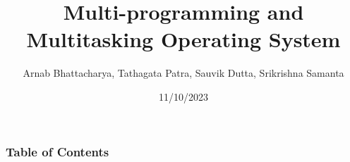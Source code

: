 \documentclass{beamer}
\title[]{Multi-programming and Multitasking Operating System} %
\author[]{Arnab Bhattacharya, Tathagata Patra, Sauvik Dutta, Srikrishna Samanta} %
\institute[] %
{
Department of Computer Science \\ %
\medskip
}
\date{11/10/2023} %
\begin{document}
\begin{frame}
\titlepage %
\end{frame}

\begin{frame}
\frametitle{Table of Contents} %
\tableofcontents %
\end{frame}



\end{document}

